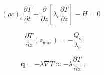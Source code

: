 



\[{\left( {\rho c} \right)_e}\frac{{\partial T}}{{\partial t}} + \frac{\partial }{{\partial z}}\left[ {{\lambda _e}\frac{{\partial T}}{{\partial z}}} \right] - H = 0{\text{ }}\]%



\[\frac{{\partial T}}{{\partial z}}({z_{\max }}) =  - \frac{{{Q_b}}}{{{\lambda _e}}}\]%


\[{\mathbf{q}} =  - \lambda \nabla T \approx  - \lambda \frac{{\partial T}}{{\partial z}}{\text{ ,}}\]%

